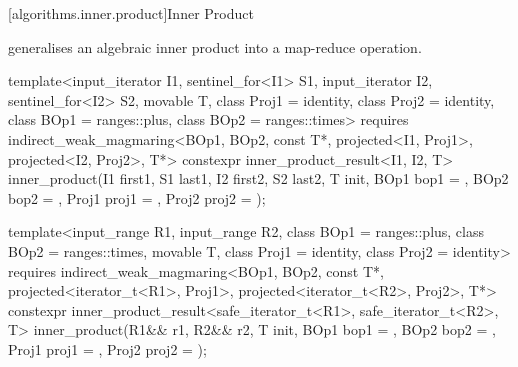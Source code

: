 
[algorithms.inner.product]{Inner Product}

 generalises an algebraic inner product into a map-reduce operation.

\begin{itemdecl}
template<input_iterator I1, sentinel_for<I1> S1, input_iterator I2, sentinel_for<I2> S2,
         movable T, class Proj1 = identity, class Proj2 = identity,
         class BOp1 = ranges::plus, class BOp2 = ranges::times>
  requires indirect_weak_magmaring<BOp1, BOp2, const T*,
                                   projected<I1, Proj1>, projected<I2, Proj2>, T*>
constexpr inner_product_result<I1, I2, T>
 inner_product(I1 first1, S1 last1, I2 first2, S2 last2, T init,
               BOp1 bop1 = {}, BOp2 bop2 = {}, Proj1 proj1 = {}, Proj2 proj2 = {});

template<input_range R1, input_range R2, class BOp1 = ranges::plus, class BOp2 = ranges::times,
         movable T, class Proj1 = identity, class Proj2 = identity>
  requires indirect_weak_magmaring<BOp1, BOp2, const T*,
                                   projected<iterator_t<R1>, Proj1>,
                                   projected<iterator_t<R2>, Proj2>, T*>
constexpr inner_product_result<safe_iterator_t<R1>, safe_iterator_t<R2>, T>
  inner_product(R1&& r1, R2&& r2, T init, BOp1 bop1 = {}, BOp2 bop2 = {},
                Proj1 proj1 = {}, Proj2 proj2 = {});
\end{itemdecl}
